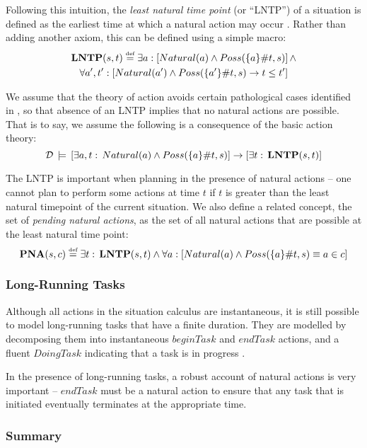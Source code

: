 Following this intuition, the \emph{least natural time point} (or
{}``LNTP'') of a situation is defined as the earliest time at which
a natural action may occur \citep{reiter01kia}. Rather than adding
another axiom, this can be defined using a simple macro: \begin{multline*}
\mathbf{LNTP}(s,t)\stackrel{\mbox{\tiny def}}{=}\exists a:\left[Natural(a)\wedge Poss(\{a\}\#t,s)\right]\wedge\\
\forall a',t':\left[Natural(a')\wedge Poss(\{a'\}\#t,s)\rightarrow t\leq t'\right]\end{multline*}


We assume that the theory of action avoids certain pathological cases
identified in \citep{reiter01kia}, so that absence of an LNTP implies
that no natural actions are possible. That is to say, we assume the
following is a consequence of the basic action theory:\[
\mathcal{D}\,\models\,\left[\exists a,t:\, Natural(a)\wedge Poss(\{a\}\#t,s)\right]\rightarrow\left[\exists t:\,\mathbf{LNTP}(s,t)\right]\]


The LNTP is important when planning in the presence of natural actions
-- one cannot plan to perform some actions at time $t$ if $t$ is
greater than the least natural timepoint of the current situation.
We also define a related concept, the set of \emph{pending natural
actions}, as the set of all natural actions that are possible at the
least natural time point:\[
\mathbf{PNA}(s,c)\stackrel{\mbox{\tiny def}}{=}\exists t:\,\mathbf{LNTP}(s,t)\wedge\forall a:\left[Natural(a)\wedge Poss(\{a\}\#t,s)\equiv a\in c\right]\]



\subsubsection{Long-Running Tasks}

Although all actions in the situation calculus are instantaneous,
it is still possible to model long-running tasks that have a finite
duration. They are modelled by decomposing them into instantaneous
$beginTask$ and $endTask$ actions, and a fluent $DoingTask$ indicating
that a task is in progress \citep{pinto94temporal}.

In the presence of long-running tasks, a robust account of natural
actions is very important -- $endTask$ must be a natural action to
ensure that any task that is initiated eventually terminates at the
appropriate time.


\subsubsection{Summary}

